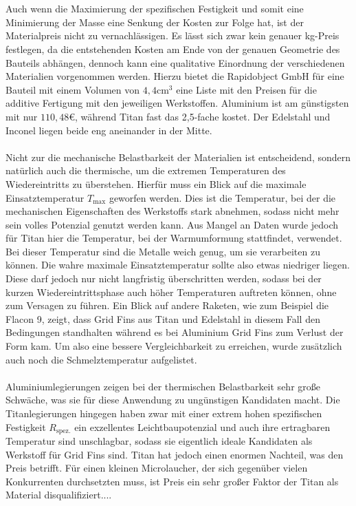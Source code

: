\\~\\
Auch wenn die Maximierung der spezifischen Festigkeit und somit eine Minimierung der Masse eine Senkung der Kosten zur Folge hat, ist der Materialpreis nicht zu vernachlässigen. Es lässt sich zwar kein genauer kg-Preis festlegen, da die entstehenden Kosten am Ende von der genauen Geometrie des Bauteils abhängen, dennoch kann eine qualitative Einordnung der verschiedenen Materialien vorgenommen werden. Hierzu bietet die Rapidobject GmbH für eine Bauteil mit einem Volumen von $4,4\mathrm{cm}^3$ eine Liste mit den Preisen für die additive Fertigung mit den jeweiligen Werkstoffen. Aluminium ist am günstigsten mit nur $110,48$€, während Titan fast das 2,5-fache kostet. Der Edelstahl und Inconel liegen beide eng aneinander in der Mitte.
\\~\\
Nicht zur die mechanische Belastbarkeit der Materialien ist entscheidend, sondern natürlich auch die thermische, um die extremen Temperaturen des Wiedereintritts zu überstehen. Hierfür muss ein Blick auf die maximale Einsatztemperatur $T_\mathrm{max}$ geworfen werden. Dies ist die Temperatur, bei der die mechanischen Eigenschaften des Werkstoffs stark abnehmen, sodass nicht mehr sein volles Potenzial genutzt werden kann. Aus Mangel an Daten wurde jedoch für Titan hier die Temperatur, bei der Warmumformung stattfindet, verwendet. Bei dieser Temperatur sind die Metalle weich genug, um sie verarbeiten zu können. Die wahre maximale Einsatztemperatur sollte also etwas niedriger liegen. Diese darf jedoch nur nicht langfristig überschritten werden, sodass bei der kurzen Wiedereintrittsphase auch höher Temperaturen auftreten können, ohne zum Versagen zu führen. Ein Blick auf andere Raketen, wie zum Beispiel die Flacon 9, zeigt, dass Grid Fins aus Titan und Edelstahl in diesem Fall den Bedingungen standhalten während es bei Aluminium Grid Fins zum Verlust der Form kam. Um also eine bessere Vergleichbarkeit zu erreichen, wurde zusätzlich auch noch die Schmelztemperatur aufgelistet.
\\~\\
Aluminiumlegierungen zeigen bei der thermischen Belastbarkeit sehr große Schwäche, was sie für diese Anwendung zu ungünstigen Kandidaten macht. Die Titanlegierungen hingegen haben zwar mit einer extrem hohen spezifischen Festigkeit $R_\mathrm{spez.}$ ein exzellentes Leichtbaupotenzial und auch ihre ertragbaren Temperatur sind unschlagbar, sodass sie eigentlich ideale Kandidaten als Werkstoff für Grid Fins sind. Titan hat jedoch einen enormen Nachteil, was den Preis betrifft. Für einen kleinen Microlaucher, der sich gegenüber vielen Konkurrenten durchsetzten muss, ist Preis ein sehr großer Faktor der Titan als Material disqualifiziert....
